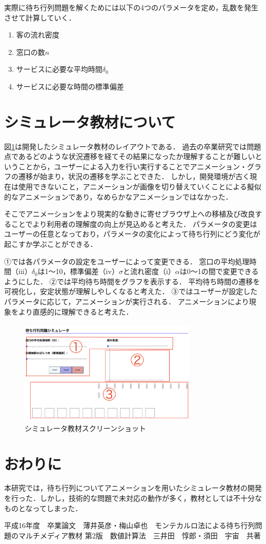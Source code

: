\documentclass[twocolumn,10pt,a4j]{ltjsarticle}
\begin{document}
実際に待ち行列問題を解くためには以下の4つのパラメータを定め，乱数を発生させて計算していく．
\begin{enumerate}
\renewcommand{\labelenumi}{(\roman{enumi})}
\item 客の流れ密度\alpha
\item 窓口の数$n$
\item サービスに必要な平均時間$\delta_0$
\item サービスに必要な時間の標準偏差\sigma
\end{enumerate}


\section{シミュレータ教材について}
図\ref{fig:教科書}は開発したシミュレータ教材のレイアウトである．
過去の卒業研究では問題点であるどのような状況遷移を経てその結果になったか理解することが難しいということから，ユーザーによる入力を行い実行することでアニメーション・グラフの遷移が始まり，状況の遷移を学ぶことできた．
しかし，開発環境が古く現在は使用できないこと，アニメーションが画像を切り替えていくことによる擬似的なアニメーションであり，なめらかなアニメーションではなかった．

そこでアニメーションをより現実的な動きに寄せブラウザ上への移植及び改良することでより利用者の理解度の向上が見込めると考えた．
パラメータの変更はユーザーの任意となっており，パラメータの変化によって待ち行列にどう変化が起こすか学ぶことができる．

①では各パラメータの設定をユーザーによって変更できる．
窓口の平均処理時間（iii）$\delta_0$は1〜10，標準偏差（iv）$\sigma$と流れ密度（i）$\alpha$は0〜1の間で変更できるようにした．
②では平均待ち時間をグラフを表示する．
平均待ち時間の遷移を可視化し，安定状態が理解しやしくなると考えた．
③ではユーザーが設定したパラメータに応じて，アニメーションが実行される．
アニメーションにより現象をより直感的に理解できると考えた．

\begin{figure}[h]
\begin{center}
\includegraphics[clip,width=85mm,height=50mm]{figures/layout_ex.pdf}
\end{center}
\caption{シミュレータ教材スクリーンショット}
\label{fig:教科書}
\end{figure}

\section{おわりに}
本研究では，待ち行列についてアニメーションを用いたシミュレータ教材の開発を行った．しかし，技術的な問題で未対応の動作が多く，教材としては不十分なものとなってしまった．

\begin{thebibliography}{99}
平成16年度　卒業論文　薄井英彦・梅山卓也　モンテカルロ法による待ち行列問題のマルチメディア教材
 第2版　数値計算法　三井田　惇郎・須田　宇宙　共著
\end{thebibliography}
\end{document}
